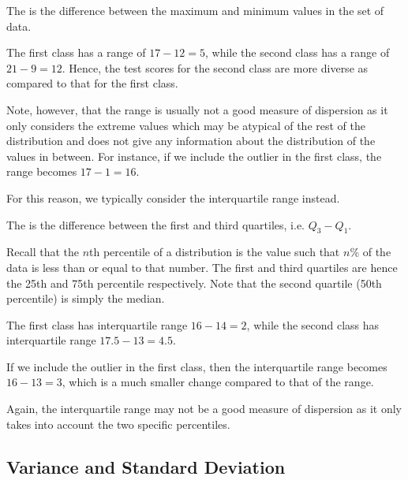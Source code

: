 \begin{definition}
    The  is the difference between the maximum and minimum values in the set of data.
\end{definition}

\begin{example}
    The first class has a range of $17 - 12 = 5$, while the second class has a range of $21 - 9 = 12$. Hence, the test scores for the second class are more diverse as compared to that for the first class.
\end{example}

Note, however, that the range is usually not a good measure of dispersion as it only considers the extreme values which may be atypical of the rest of the distribution and does not give any information about the distribution of the values in between. For instance, if we include the outlier in the first class, the range becomes $17 - 1 = 16$.

For this reason, we typically consider the interquartile range instead.

\begin{definition}
    The  is the difference between the first and third quartiles, i.e. $Q_3 - Q_1$.
\end{definition}

Recall that the $n$th percentile of a distribution is the value such that $n$\% of the data is less than or equal to that number. The first and third quartiles are hence the 25th and 75th percentile respectively. Note that the second quartile (50th percentile) is simply the median.

\begin{example}
    The first class has interquartile range $16 - 14 = 2$, while the second class has interquartile range $17.5 - 13 = 4.5$.
    
    If we include the outlier in the first class, then the interquartile range becomes $16 - 13 = 3$, which is a much smaller change compared to that of the range.
\end{example}

Again, the interquartile range may not be a good measure of dispersion as it only takes into account the two specific percentiles.

\subsection{Variance and Standard Deviation}

